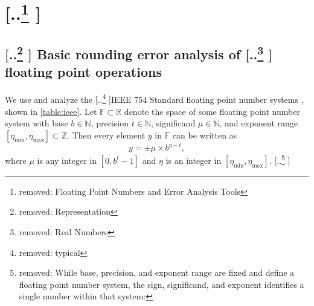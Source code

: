 \documentclass[review,onefignum,onetabnum]{siamart190516}
\newcommand{\R}{\mathbb{R}}
\newcommand{\F}{\mathbb{F}}
\providecommand{\DIFadd}[1]{{\protect\color{blue} \sf #1}} %
\providecommand{\DIFdel}[1]{{\protect\color{red} [..\footnote{removed: #1} ]}} %
\providecommand{\DIFaddbegin}{} %
\providecommand{\DIFaddend}{} %
\providecommand{\DIFdelbegin}{} %
\providecommand{\DIFdelend}{} %
\begin{document}
\section{\DIFdel{Floating Point Numbers and Error Analysis Tools}}%
\addtocounter{section}{-1}%

\DIFdelend \DIFaddbegin 
\DIFaddend \subsection{\DIFdelbegin \DIFdel{Representation }\DIFdelend \DIFaddbegin \DIFadd{Basic rounding error analysis }\DIFaddend of \DIFdelbegin \DIFdel{Real Numbers}\DIFdelend \DIFaddbegin \DIFadd{floating point operations}\DIFaddend }%
\DIFdelbegin %

\DIFdelend \DIFaddbegin \label{sec:backgroundRE}
\DIFaddend We use and analyze the \DIFdelbegin \DIFdel{typical }\DIFdelend IEEE 754 Standard floating point number systems\DIFaddbegin \DIFadd{, shown in \cref{table:ieee}}\DIFaddend .
Let $\F \subset \R$ denote the space of some floating point number system with base $b\in\mathbb{N}$, precision $t\in\mathbb{N}$, significand $\mu\in\mathbb{N}$, and exponent range $[\eta_{\text{min}}, \eta_{\text{max}}]\subset \mathbb{Z}$.
Then every element $y$ in $\F$ can be written as 
\begin{equation}
y = \pm \mu\times b^{\eta-t},
\label{eqn:FPbasic}
\end{equation} 
where $\mu$ is any integer in $[0,b^{t}-1]$ and $\eta$ is an integer in  $[\eta_{\text{min}}, \eta_{\text{max}}]$.
\DIFdelbegin \DIFdel{While base, precision, and exponent range are fixed and define a floating point number system, the sign, significand, and exponent identifies a single number within that system:
}%
\end{document}
